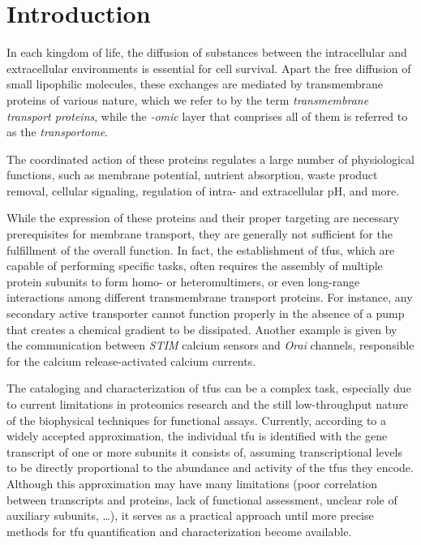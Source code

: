 \section{Introduction}

In each kingdom of life, the diffusion of substances between the intracellular and extracellular environments is essential for cell survival.
Apart the free diffusion of small lipophilic molecules, these exchanges are mediated by transmembrane proteins of various nature, which we refer to by the term \textit{transmembrane transport proteins}, while the \textit{-omic} layer that comprises all of them is referred to as the \textit{transportome}.

The coordinated action of these proteins regulates a large number of physiological functions, such as membrane potential, nutrient absorption, waste product removal, cellular signaling, regulation of intra- and extracellular pH, and more.

While the expression of these proteins and their proper targeting are necessary prerequisites for membrane transport, they are generally not sufficient for the fulfillment of the overall function.
In fact, the establishment of \glspl{tfu}, which are capable of performing specific tasks, often requires the assembly of multiple protein subunits to form homo- or heteromultimers, or even long-range interactions among different transmembrane transport proteins.
For instance, any secondary active transporter cannot function properly in the absence of a pump that creates a chemical gradient to be dissipated.
Another example is given by the communication between \textit{STIM} calcium sensors and \textit{Orai} channels, responsible for the calcium release-activated calcium currents.

The cataloging and characterization of \glspl{tfu} can be a complex task, especially due to current limitations in proteomics research and the still low-throughput nature of the biophysical techniques for functional assays.
Currently, according to a widely accepted approximation, the individual \gls{tfu} is identified with the gene transcript of one or more subunits it consists of, assuming transcriptional levels to be directly proportional to the abundance and activity of the \glspl{tfu} they encode.
Although this approximation may have many limitations (poor correlation between transcripts and proteins, lack of functional assessment, unclear role of auxiliary subunits, \ldots), it serves as a practical approach until more precise methods for \gls{tfu} quantification and characterization become available.

